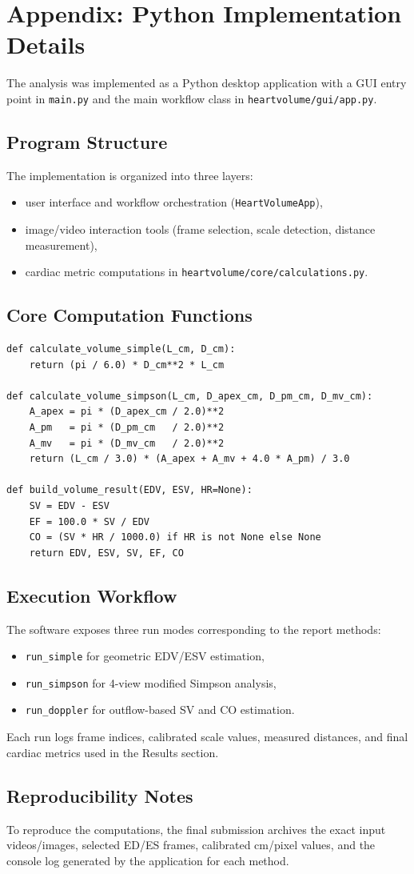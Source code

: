 \appendices
\section{Appendix: Python Implementation Details}
The analysis was implemented as a Python desktop application with a GUI entry point in \texttt{main.py} and the main workflow class in \texttt{heartvolume/gui/app.py}.

\subsection{Program Structure}
The implementation is organized into three layers:
\begin{itemize}
    \item user interface and workflow orchestration (\texttt{HeartVolumeApp}),
    \item image/video interaction tools (frame selection, scale detection, distance measurement),
    \item cardiac metric computations in \texttt{heartvolume/core/calculations.py}.
\end{itemize}

\subsection{Core Computation Functions}
\begin{verbatim}
def calculate_volume_simple(L_cm, D_cm):
    return (pi / 6.0) * D_cm**2 * L_cm

def calculate_volume_simpson(L_cm, D_apex_cm, D_pm_cm, D_mv_cm):
    A_apex = pi * (D_apex_cm / 2.0)**2
    A_pm   = pi * (D_pm_cm   / 2.0)**2
    A_mv   = pi * (D_mv_cm   / 2.0)**2
    return (L_cm / 3.0) * (A_apex + A_mv + 4.0 * A_pm) / 3.0

def build_volume_result(EDV, ESV, HR=None):
    SV = EDV - ESV
    EF = 100.0 * SV / EDV
    CO = (SV * HR / 1000.0) if HR is not None else None
    return EDV, ESV, SV, EF, CO
\end{verbatim}

\subsection{Execution Workflow}
The software exposes three run modes corresponding to the report methods:
\begin{itemize}
    \item \texttt{run\_simple} for geometric EDV/ESV estimation,
    \item \texttt{run\_simpson} for 4-view modified Simpson analysis,
    \item \texttt{run\_doppler} for outflow-based SV and CO estimation.
\end{itemize}
Each run logs frame indices, calibrated scale values, measured distances, and final cardiac metrics used in the Results section.

\subsection{Reproducibility Notes}
To reproduce the computations, the final submission archives the exact input videos/images, selected ED/ES frames, calibrated cm/pixel values, and the console log generated by the application for each method.
